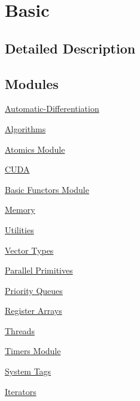 \hypertarget{group___basic}{}\section{Basic}
\label{group___basic}


\subsection{Detailed Description}
\subsection*{Modules}
\begin{DoxyCompactItemize}
\item 
\hyperlink{group___auto_diff_module}{Automatic-\/\+Differentiation}
\item 
\hyperlink{group___algorithms_module}{Algorithms}
\item 
\hyperlink{group___atomics}{Atomics Module}
\item 
\hyperlink{group___c_u_d_a_module}{C\+U\+DA}
\item 
\hyperlink{group___basic_functors}{Basic Functors Module}
\item 
\hyperlink{group___memory}{Memory}
\item 
\hyperlink{group___basic_utils}{Utilities}
\item 
\hyperlink{group___vector_types_module}{Vector Types}
\item 
\hyperlink{group___primitives}{Parallel Primitives}
\item 
\hyperlink{group___priority_queues}{Priority Queues}
\item 
\hyperlink{group___register_arrays_module}{Register Arrays}
\item 
\hyperlink{group___threads}{Threads}
\item 
\hyperlink{group___timers_module}{Timers Module}
\item 
\hyperlink{group___system_tags}{System Tags}
\item 
\hyperlink{group___iterators}{Iterators}
\end{DoxyCompactItemize}
